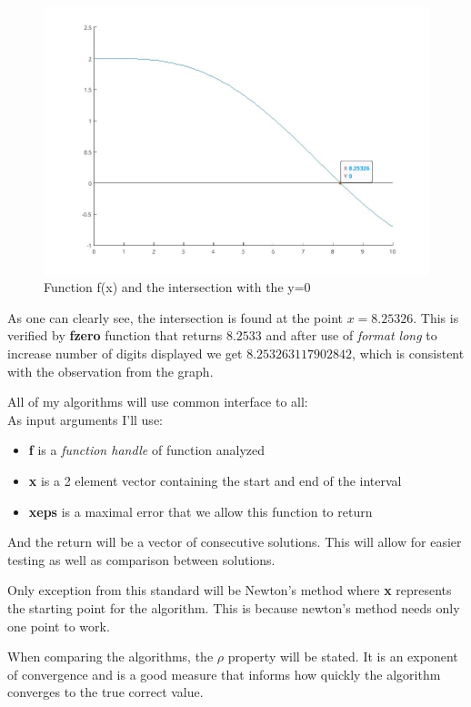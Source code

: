 \documentclass[11pt]{article}
\begin{document}
\begin{figure}[ht!]
    \includegraphics[width=\textwidth]{Function_plot.jpg}
    \caption{Function f(x) and the intersection with the y=0}
    \label{fig:functionplot}
\end{figure}

As one can clearly see, the intersection is found at the point $x=8.25326$.
This is verified by \textbf{fzero} function that returns $8.2533$ and after use
of \textit{format long} to increase number of digits displayed we get
$8.253263117902842$, which is consistent with the observation from the graph.

\newpage
All of my algorithms will use common interface to all: \\
As input arguments I'll use:
\begin{itemize}
    \setlength\itemsep{0em}
    \item \textbf{f} is a \textit{function handle} of function analyzed 
    \item \textbf{x} is a 2 element vector containing the start and end of the
        interval
    \item \textbf{xeps} is a maximal error that we allow this function to
        return
\end{itemize}
And the return will be a vector of consecutive solutions. This will allow for
easier testing as well as comparison between solutions.

Only exception from this standard will be Newton's method where \textbf{x}
represents the starting point for the algorithm. This is because newton's
method needs only one point to work.

When comparing the algorithms, the $\rho$ property will be stated. It is an
exponent of convergence and is a good measure that informs how quickly the
algorithm converges to the true correct value.
\end{document}

